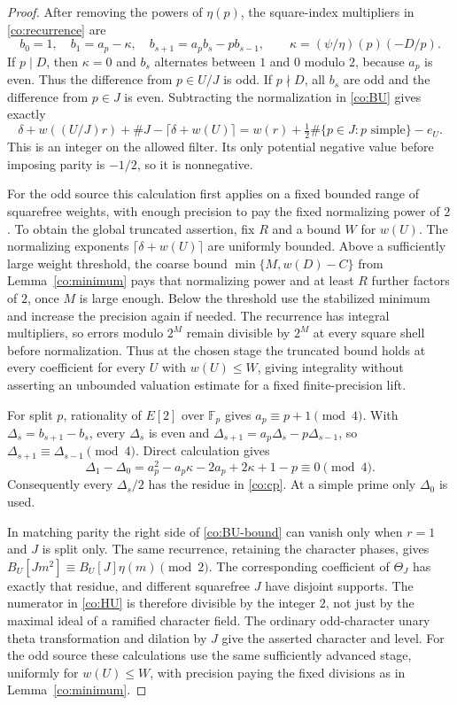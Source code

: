 \begin{proof}
After removing the powers of $\eta(p)$, the square-index multipliers
in \eqref{co:recurrence} are
\[
 b_0=1,\quad b_1=a_p-\kappa,\quad
 b_{s+1}=a_pb_s-pb_{s-1},\qquad
 \kappa=(\psi/\eta)(p)(-D/p).
\]
If $p\mid D$, then $\kappa=0$ and $b_s$ alternates between $1$ and
$0$ modulo $2$, because $a_p$ is even.  Thus the difference from
$p\in U/J$ is odd.  If $p\nmid D$, all $b_s$ are odd and the
difference from $p\in J$ is even.  Subtracting the normalization in
\eqref{co:BU} gives exactly
\[
 \delta+w((U/J)r)+\#J-\lceil\delta+w(U)\rceil
 =w(r)+\tfrac12\#\{p\in J:p\text{ simple}\}-e_U.
\]
This is an integer on the allowed filter.  Its only potential
negative value before imposing parity is $-1/2$, so it is nonnegative.

For the odd source this calculation first applies on a fixed bounded
range of squarefree weights, with enough precision to pay the fixed
normalizing power of $2$.  To obtain the global truncated assertion,
fix $R$ and a bound $W$ for $w(U)$.  The normalizing exponents
$\lceil\delta+w(U)\rceil$ are uniformly bounded.  Above a sufficiently large weight
threshold, the coarse bound $\min\{M,w(D)-C\}$ from
Lemma~\ref{co:minimum} pays that normalizing power and at least $R$
further factors of $2$, once $M$ is large enough.  Below the threshold
use the stabilized minimum and increase the precision again if needed.
The recurrence has integral multipliers, so errors modulo $2^M$
remain divisible by $2^M$ at every square shell before normalization.
Thus at the chosen stage the truncated bound holds at every
coefficient for every $U$ with $w(U)\le W$, giving integrality
without asserting an unbounded valuation estimate for a fixed
finite-precision lift.

For split $p$, rationality of $E[2]$ over $\mathbb F_p$ gives
$a_p\equiv p+1\pmod4$.  With $\Delta_s=b_{s+1}-b_s$, every
$\Delta_s$ is even and
$\Delta_{s+1}=a_p\Delta_s-p\Delta_{s-1}$, so
$\Delta_{s+1}\equiv\Delta_{s-1}\pmod4$.
Direct calculation gives
\[
 \Delta_1-\Delta_0
  =a_p^2-a_p\kappa-2a_p+2\kappa+1-p\equiv0\pmod4.
\]
Consequently every $\Delta_s/2$ has the residue in \eqref{co:cp}.
At a simple prime only $\Delta_0$ is used.

In matching parity the right side of \eqref{co:BU-bound} can vanish
only when $r=1$ and $J$ is split only.  The same recurrence, retaining
the character phases, gives
$B_U[Jm^2]\equiv B_U[J]\eta(m)\pmod {2}$.
The corresponding coefficient of $\Theta_J$ has exactly that
residue, and different squarefree $J$ have disjoint supports.
The numerator in \eqref{co:HU} is therefore divisible by the integer
$2$, not just by the maximal ideal of a ramified character field.
The ordinary odd-character unary theta transformation and dilation
by $J$ give the asserted character and level.  For the odd source
these calculations use the same sufficiently advanced stage,
uniformly for $w(U)\le W$, with precision paying the fixed
divisions as in Lemma~\ref{co:minimum}.
\end{proof}

